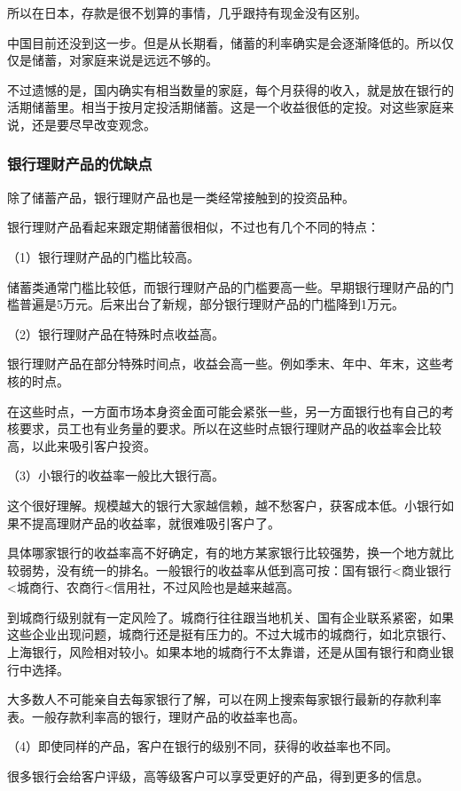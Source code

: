 所以在日本，存款是很不划算的事情，几乎跟持有现金没有区别。

中国目前还没到这一步。但是从长期看，储蓄的利率确实是会逐渐降低的。所以仅仅是储蓄，对家庭来说是远远不够的。

不过遗憾的是，国内确实有相当数量的家庭，每个月获得的收入，就是放在银行的活期储蓄里。相当于按月定投活期储蓄。这是一个收益很低的定投。对这些家庭来说，还是要尽早改变观念。

\subsubsection{银行理财产品的优缺点}

除了储蓄产品，银行理财产品也是一类经常接触到的投资品种。

银行理财产品看起来跟定期储蓄很相似，不过也有几个不同的特点：

（1）银行理财产品的门槛比较高。

储蓄类通常门槛比较低，而银行理财产品的门槛要高一些。早期银行理财产品的门槛普遍是5万元。后来出台了新规，部分银行理财产品的门槛降到1万元。

（2）银行理财产品在特殊时点收益高。

银行理财产品在部分特殊时间点，收益会高一些。例如季末、年中、年末，这些考核的时点。

在这些时点，一方面市场本身资金面可能会紧张一些，另一方面银行也有自己的考核要求，员工也有业务量的要求。所以在这些时点银行理财产品的收益率会比较高，以此来吸引客户投资。

（3）小银行的收益率一般比大银行高。

这个很好理解。规模越大的银行大家越信赖，越不愁客户，获客成本低。小银行如果不提高理财产品的收益率，就很难吸引客户了。

具体哪家银行的收益率高不好确定，有的地方某家银行比较强势，换一个地方就比较弱势，没有统一的排名。一般银行的收益率从低到高可按：国有银行<商业银行<城商行、农商行<信用社，不过风险也是越来越高。

到城商行级别就有一定风险了。城商行往往跟当地机关、国有企业联系紧密，如果这些企业出现问题，城商行还是挺有压力的。不过大城市的城商行，如北京银行、上海银行，风险相对较小。如果本地的城商行不太靠谱，还是从国有银行和商业银行中选择。

大多数人不可能亲自去每家银行了解，可以在网上搜索每家银行最新的存款利率表。一般存款利率高的银行，理财产品的收益率也高。

（4）即使同样的产品，客户在银行的级别不同，获得的收益率也不同。

很多银行会给客户评级，高等级客户可以享受更好的产品，得到更多的信息。

